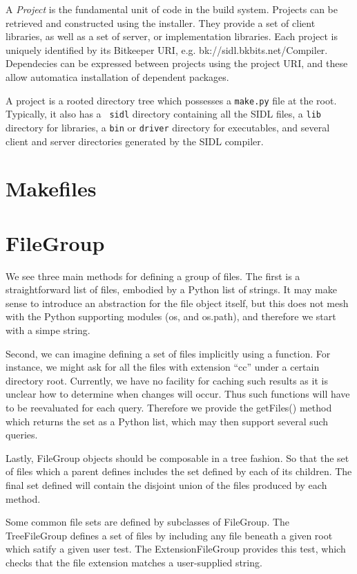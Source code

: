 A {\em Project} is the fundamental unit of code in the build system. Projects can be retrieved and constructed using the
installer. They provide a set of client libraries, as well as a set of server, or implementation libraries. Each project
is uniquely identified by its Bitkeeper URI, e.g. bk://sidl.bkbits.net/Compiler. Dependecies can be expressed between
projects using the project URI, and these allow automatica installation of dependent packages.

A project is a rooted directory tree which possesses a {\tt make.py} file at the root. Typically, it also has a {\tt
sidl} directory containing all the SIDL files, a {\tt lib} directory for libraries, a {\tt bin} or {\tt driver}
directory for executables, and several client and server directories generated by the SIDL compiler.

\section{Makefiles}

\section{FileGroup}

We see three main methods for defining a group of files. The first is a straightforward list of files, embodied by a
Python list of strings. It may make sense to introduce an abstraction for the file object itself, but this does not mesh
with the Python supporting modules (os, and os.path), and therefore we start with a simpe string.

Second, we can imagine defining a set of files implicitly using a function. For instance, we might ask for all the files
with extension ``cc'' under a certain directory root. Currently, we have no facility for caching such results as it is
unclear how to determine when changes will occur. Thus such functions will have to be reevaluated for each
query. Therefore we provide the getFiles() method which returns the set as a Python list, which may then support several
such queries.

Lastly, FileGroup objects should be composable in a tree fashion. So that the set of files which a parent defines
includes the set defined by each of its children. The final set defined will contain the disjoint union of the files
produced by each method.

Some common file sets are defined by subclasses of FileGroup. The TreeFileGroup defines a set of files by including any
file beneath a given root which satify a given user test. The ExtensionFileGroup provides this test, which checks that
the file extension matches a user-supplied string.

